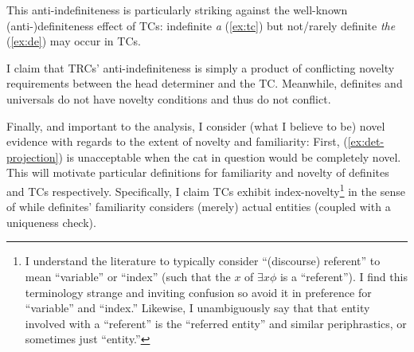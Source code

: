 \documentclass[11pt]{article}
\begin{document}
\begin{exe}
	\label{ex:det:universal}
	\label{ex:det:indefinite}
	\label{ex:det:rrc}
\end{exe}

This anti-indefiniteness is particularly striking against the well-known (anti-)definiteness effect of TCs: indefinite \textit{a} (\ref{ex:tc}) but not/rarely definite \textit{the} (\ref{ex:de}) may occur in TCs.

\begin{exe}
	\label{ex:de}
\end{exe}

I claim that TRCs' anti-indefiniteness is simply a product of conflicting novelty requirements between the head determiner and the TC. Meanwhile, definites and universals do not have novelty conditions and thus do not conflict.

Finally, and important to the analysis, I consider (what I believe to be) novel evidence with regards to the extent of novelty and familiarity: First, (\ref{ex:det-projection}) is unacceptable when the cat in question would be completely novel. This will motivate particular definitions for familiarity and novelty of definites and TCs respectively. Specifically, I claim TCs exhibit index-novelty\footnote{I understand the literature to typically consider ``(discourse) referent'' to mean ``variable'' or ``index'' (such that the \(x\) of \(\exists x \phi\) is a ``referent''). I find this terminology strange and inviting confusion so avoid it in preference for ``variable'' and ``index.'' Likewise, I unambiguously say that that entity involved with a ``referent'' is the ``referred entity'' and similar periphrastics, or sometimes just ``entity.''} in the sense of \citet{heimSemanticsDefiniteIndefinite1982} while definites' familiarity considers (merely) actual entities (coupled with a uniqueness check).

\begin{exe}
	\label{ex:det-projection}
\end{exe}
\end{document}
